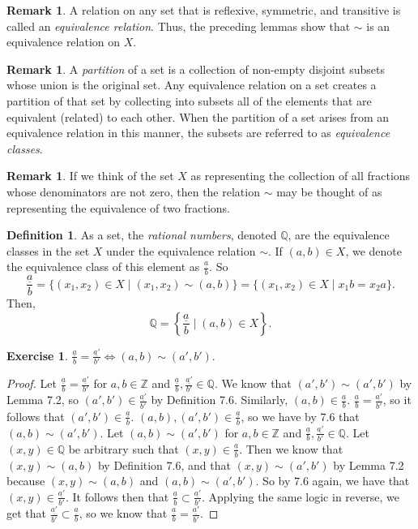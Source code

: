 \documentclass[12pt]{article}
\newcommand{\bbQ}{\mathbb{Q}}
\newcommand{\bbZ}{\mathbb{Z}}
\newcommand{\fr}[2]{\frac{\underline{#1}}{#2}}
\renewcommand{\_}[1]{\underline{ #1 }}
\theoremstyle{definition}
\newtheorem{definition}[theorem]{Definition}
\newtheorem{exercise}[theorem]{Exercise}
\newtheorem{remark}[theorem]{Remark}
\numberwithin{equation}{subsection}
\begin{document}
\begin{remark}  
A relation on any set that is reflexive, symmetric, and transitive is called an {\em equivalence relation}.
Thus, the preceding lemmas show that $\sim$ is an equivalence relation on $X$.
\end{remark}  

\begin{remark}  
A {\em partition} of a set is a collection of non-empty
disjoint subsets whose union is the original set.  
Any equivalence relation on a set creates a partition of that set by collecting into subsets all
of the elements that are equivalent (related) to each other.
When the partition of a set arises from an equivalence relation in this manner, the subsets
are referred to as {\em equivalence classes}.
\end{remark}  

\begin{remark}  
If we think of the set $X$ as representing the collection of all fractions whose denominators are not
zero, then the relation $\sim$ may be thought of as representing the equivalence of two fractions.
\end{remark}  

\begin{definition}
As a set, the {\em rational numbers}, denoted $\bbQ$, are the equivalence classes in the set $X$ under
the equivalence relation $\sim$.
If $(a,b)\in X$, we denote the equivalence class of this element as $\displaystyle \fr{a}{b}$.   So
$$\fr{a}{b}=\{(x_1,x_2)\in X\mid (x_1,x_2)\sim (a,b)\}=\{(x_1,x_2)\in X\mid x_1 b=x_2 a\}.$$
Then,
$$
\bbQ=\left\{ {\fr{a}{b}} \mid (a,b)\in X\right\}.
$$
\end{definition}

\begin{exercise}
$\displaystyle \fr{a}{b}=\fr{a'}{b'}\Longleftrightarrow (a,b)\sim (a',b').$
\end{exercise}

\begin{proof}
Let $\fr{a}{b} = \fr{a'}{b'}$ for $a,b \in \bbZ$ and $\fr{a}{b}, \fr{a'}{b'} \in \bbQ$. We know that $(a',b') \sim (a',b')$ by Lemma 7.2, so $(a',b') \in \fr{a'}{b'}$ by Definition 7.6. Similarly, $(a,b) \in \fr{a}{b}$. $\fr{a}{b} = \fr{a'}{b'}$, so it follows that $(a',b') \in \fr{a}{b}$. $(a,b),(a',b') \in \fr{a}{b}$, so we have by 7.6 that $(a,b) \sim (a',b')$. \newline
Let $(a,b) \sim (a',b')$ for $a,b \in \bbZ$ and $\fr{a}{b}, \fr{a'}{b'} \in \bbQ$. Let $(x,y) \in \bbQ$ be arbitrary such that $(x,y) \in \fr{a}{b}$. Then we know that $(x,y) \sim (a,b)$ by Definition 7.6, and that $(x,y) \sim (a',b')$ by Lemma 7.2 because $(x,y) \sim (a,b)$ and $(a,b) \sim (a',b')$. So by 7.6 again, we have that $(x,y) \in \fr{a'}{b'}$. It follows then that $\fr{a}{b} \subset \fr{a'}{b'}$. Applying the same logic in reverse, we get that $\fr{a'}{b'} \subset \fr{a}{b}$, so we know that $\fr{a}{b} = \fr{a'}{b'}$.
\end{proof}
\end{document}
